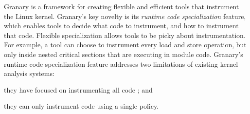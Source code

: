 \documentclass[preprint]{sigplanconf}
\begin{document}
Granary is a framework for creating flexible and efficient tools that instrument the Linux kernel. Granary's key novelty is its \emph{runtime code specialization} feature, which enables tools to decide what code to instrument, and how to instrument that code. Flexible specialization allows tools to be picky about instrumentation. For example, a tool can choose to instrument every load and store operation, but only inside nested critical sections that are executing in module code. Granary's runtime code specialization feature addresses two limitations of existing kernel analysis systems: \begin{inparaenum}[i)]
	\item they have focused on instrumenting all code \cite{DRK,btkernel,QEMU}; and
	\item they can only instrument code using a single policy.
\end{inparaenum} 

\end{document}
